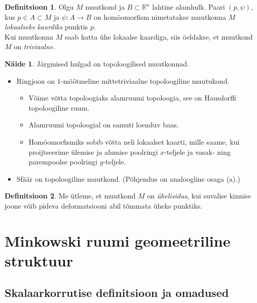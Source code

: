 \documentclass[a4paper,12pt]{article}
\theoremstyle{plain}
\theoremstyle{definition}
\newtheorem{definitsioon}{Definitsioon}[section]
\newtheorem{naide}{Näide}[section]
\numberwithin{equation}{section}
\begin{document}
\begin{definitsioon}
Olgu $M$ muutkond ja $B \subset \mathbb{R}^n$ lahtine alamhulk. Paari $\left(p, \psi\right)$, kus $p \in A \subset M$ ja $\psi : A \rightarrow B$ on homöomorfism nimetatakse muutkonna $M$ \emph{lokaalseks kaardiks} punktis $p$.\\
Kui muutkonna $M$ saab katta ühe lokaalse kaardiga, siis öeldakse, et muutkond $M$ on \emph{triviaalne}.
\end{definitsioon}

\begin{naide}
Järgmised hulgad on topoloogilised muutkonnad.
\begin{itemize}
\item[(a)] Ringjoon on $1$-mõõtmeline mittetriviaalne topoloogiline muutukond.
\begin{itemize}
\item[1)] Võime võtta topoloogiaks alamruumi topoloogia, see on Hausdorffi topoloogiline ruum.
\item[2)] Alamruumi topoloogial on samuti loenduv baas.
\item[3)] Homöomorfismiks sobib võtta neli lokaalset kaarti, mille saame, kui proijtseerime ülemise ja alumise poolringi $x$-teljele ja vasak- ning parempoolse poolringi $y$-teljele.
\end{itemize}
\item[(b)] Sfäär on topoloogiline muutkond. (Põhjendus on analoogline osaga (a).)
\end{itemize}
\end{naide}

\begin{definitsioon}
Me ütleme, et muutkond $M$ on \emph{ühelisidus}, kui suvalise kinnise joone võib pideva deformatsiooni abil tõmmata üheks punktiks.
\end{definitsioon}

\newpage

\section{Minkowski ruumi geomeetriline struktuur}

\subsection{Skalaarkorrutise definitsioon ja omadused}
\end{document}
